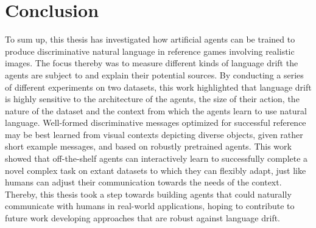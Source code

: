 \section{Conclusion}
To sum up, this thesis has investigated how artificial agents can be trained to produce discriminative natural language in reference games involving realistic images. The focus thereby was to measure different kinds of language drift the agents are subject to and explain their potential sources. By conducting a series of different experiments on two datasets, this work highlighted that language drift is highly sensitive to the architecture of the agents, the size of their action, the nature of the dataset and the context from which the agents learn to use natural language. Well-formed discriminative messages optimized for successful reference may be best learned from visual contexts depicting diverse objects, given rather short example messages, and based on robustly pretrained agents.  
This work showed that off-the-shelf agents can interactively learn to successfully complete a novel complex task on extant datasets to which they can flexibly adapt, just like humans can adjust their communication towards the needs of the context.
Thereby, this thesis took a step towards building agents that could naturally communicate with humans in real-world applications, hoping to contribute to future work developing approaches that are robust against language drift.